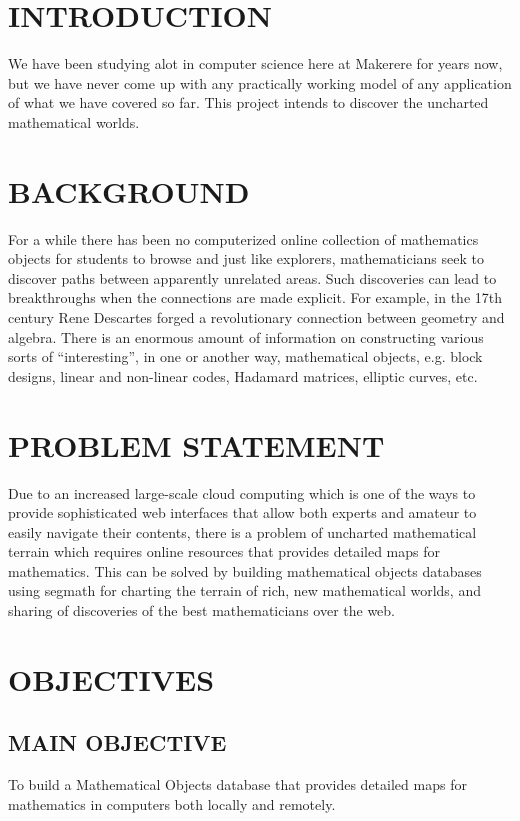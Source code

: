 \documentclass{article}
\begin{document}
\section{INTRODUCTION}\label{sec:intro}
We have been studying alot in computer science here at Makerere for years now, but we have never come up with any practically working model of any application of what we have covered so far. This project intends to discover the uncharted mathematical worlds. \\

\section{BACKGROUND}
For a while there has been no computerized online collection of mathematics objects for students to browse and just like explorers, mathematicians seek to discover paths between apparently unrelated areas. Such discoveries can lead to breakthroughs when the connections are made explicit. For example, in the 17th century Rene Descartes forged a revolutionary connection between geometry and algebra. 
There is an enormous amount of information on constructing various sorts of “interesting”, in one or another way, mathematical objects, e.g. block designs, linear and non-linear codes, Hadamard matrices, elliptic curves, etc.\\

\section{PROBLEM STATEMENT}
Due to an increased large-scale cloud computing which is one of the ways to provide sophisticated web interfaces that allow both experts and amateur to easily navigate their contents, there is a problem of uncharted mathematical terrain which requires online resources that provides detailed maps for mathematics. This can be solved by building mathematical objects databases using segmath for charting the terrain of rich, new mathematical worlds, and sharing of discoveries of the best mathematicians over the web.   \\

\section{OBJECTIVES}

\subsection{MAIN OBJECTIVE}
To build a Mathematical Objects database that provides detailed maps for
mathematics in computers both locally and remotely.\\
\end{document}
